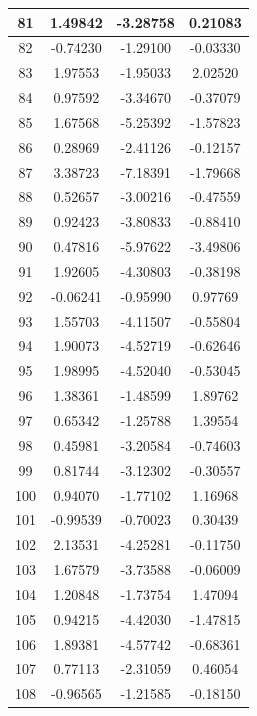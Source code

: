 \documentclass[14pt,a4paper]{scrartcl}
\begin{document}
\begin{table}[ht]
	\centering
	\begin{tabular}{|c||c||c||c|}
	81 & 1.49842 & -3.28758 & 0.21083 \\ 
	\hline
	82 & -0.74230 & -1.29100 & -0.03330 \\ 
	\hline
	83 & 1.97553 & -1.95033 & 2.02520 \\ 
	\hline
	84 & 0.97592 & -3.34670 & -0.37079 \\ 
	\hline
	85 & 1.67568 & -5.25392 & -1.57823 \\ 
	\hline
	86 & 0.28969 & -2.41126 & -0.12157 \\ 
	\hline
	87 & 3.38723 & -7.18391 & -1.79668 \\ 
	\hline
	88 & 0.52657 & -3.00216 & -0.47559 \\ 
	\hline
	89 & 0.92423 & -3.80833 & -0.88410 \\ 
	\hline
	90 & 0.47816 & -5.97622 & -3.49806 \\ 
	\hline
	91 & 1.92605 & -4.30803 & -0.38198 \\ 
	\hline
	92 & -0.06241 & -0.95990 & 0.97769 \\ 
	\hline
	93 & 1.55703 & -4.11507 & -0.55804 \\ 
	\hline
	94 & 1.90073 & -4.52719 & -0.62646 \\ 
	\hline
	95 & 1.98995 & -4.52040 & -0.53045 \\ 
	\hline
	96 & 1.38361 & -1.48599 & 1.89762 \\ 
	\hline
	97 & 0.65342 & -1.25788 & 1.39554 \\ 
	\hline
	98 & 0.45981 & -3.20584 & -0.74603 \\ 
	\hline
	99 & 0.81744 & -3.12302 & -0.30557 \\ 
	\hline
	100 & 0.94070 & -1.77102 & 1.16968 \\ 
	\hline
	101 & -0.99539 & -0.70023 & 0.30439 \\ 
	\hline
	102 & 2.13531 & -4.25281 & -0.11750 \\ 
	\hline
	103 & 1.67579 & -3.73588 & -0.06009 \\ 
	\hline
	104 & 1.20848 & -1.73754 & 1.47094 \\ 
	\hline
	105 & 0.94215 & -4.42030 & -1.47815 \\ 
	\hline
	106 & 1.89381 & -4.57742 & -0.68361 \\ 
	\hline
	107 & 0.77113 & -2.31059 & 0.46054 \\ 
	\hline
	108 & -0.96565 & -1.21585 & -0.18150 \\ 

\end{tabular}
\end{table}
\end{document}

